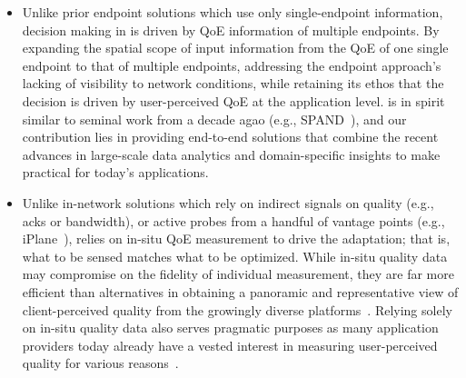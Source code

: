 \begin{itemize}

\item Unlike prior endpoint solutions which use only single-endpoint 
information, decision making in \ddn is driven by QoE information of multiple endpoints. 
By expanding the spatial scope of input information from the QoE of one 
single endpoint to that of multiple endpoints, 
\ddn addressing the endpoint approach's lacking of visibility to network conditions, 
while retaining its ethos that the decision is driven by user-perceived QoE at 
the application level.
\ddn is in spirit similar to seminal work from a decade agao (e.g., SPAND~\cite{spand}),
and our contribution lies in providing end-to-end solutions that combine 
the recent advances in large-scale data analytics and domain-specific insights
to make \ddn practical for today's applications.

\item Unlike in-network solutions which rely on indirect signals on quality (e.g., acks 
or bandwidth), or active probes from a handful 
of vantage points (e.g., iPlane~\cite{iplaneosdi}), \ddn relies on in-situ QoE 
measurement to drive the adaptation; that is, what to be sensed matches
what to be optimized.
While in-situ quality data may compromise on the fidelity of 
individual measurement, they are far more efficient than 
alternatives in obtaining a panoramic and representative
 view of client-perceived quality from the growingly diverse platforms~\cite{insitu}.
Relying solely on in-situ quality data also serves pragmatic 
purposes as many application providers today already have 
a vested interest in measuring user-perceived quality for 
various reasons~\cite{sigcomm-qoe-workshop}.

\end{itemize}





